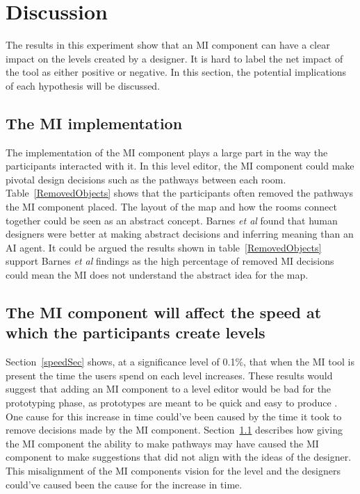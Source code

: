 \documentclass[journal]{IEEEtran}
\begin{document}
\section{Discussion}
The results in this experiment show that an MI component can have a clear impact on the levels created by a designer. It is hard to label the net impact of the tool as either positive or negative. In this section, the potential implications of each hypothesis will be discussed.  

\subsection{The MI implementation}\label{implementation}
 The implementation of the MI component plays a large part in the way the participants interacted with it. In this level editor, the MI component could make pivotal design decisions such as the pathways between each room. Table~\ref{RemovedObjects} shows that the participants often removed the pathways the MI component placed. The layout of the map and how the rooms connect together could be seen as an abstract concept. Barnes \textit{et al}\cite{barnes2015designing} found that human designers were better at making abstract decisions and inferring meaning than an AI agent. It could be argued the results shown in table~\ref{RemovedObjects} support Barnes \textit{et al}\cite{barnes2015designing} findings as the high percentage of removed MI decisions could mean the MI does not understand the abstract idea for the map. 

\subsection{The MI component will affect the speed at which the participants create levels}\label{speedDiss}
Section~\ref{speedSec} shows, at a significance level of 0.1\%, that when the MI tool is present the time the users spend on each level increases. These results would suggest that adding an MI component to a level editor would be bad for the prototyping phase, as prototypes are meant to be quick and easy to produce \cite{budde1992prototyping}. One cause for this increase in time could've been caused by the time it took to remove decisions made by the MI component. Section~\ref{implementation} describes how giving the MI component the ability to make pathways may have caused the MI component to make suggestions that did not align with the ideas of the designer. This misalignment of the MI components vision for the level and the designers could've caused been the cause for the increase in time. 
\end{document}

